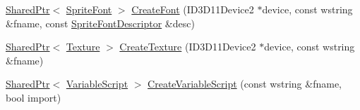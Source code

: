 \begin{DoxyCompactItemize}
\item 
\hyperlink{namespacemage_a1e01ae66713838a7a67d30e44c67703e}{Shared\+Ptr}$<$ \hyperlink{classmage_1_1_sprite_font}{Sprite\+Font} $>$ \hyperlink{classmage_1_1_resource_factory_a4f2e39f6195c13bd885c46b8d130bdfc}{Create\+Font} (I\+D3\+D11\+Device2 $\ast$device, const wstring \&fname, const \hyperlink{structmage_1_1_sprite_font_descriptor}{Sprite\+Font\+Descriptor} \&desc)
\item 
\hyperlink{namespacemage_a1e01ae66713838a7a67d30e44c67703e}{Shared\+Ptr}$<$ \hyperlink{classmage_1_1_texture}{Texture} $>$ \hyperlink{classmage_1_1_resource_factory_ab7f2069f6baf97fb158bf45a76e0a657}{Create\+Texture} (I\+D3\+D11\+Device2 $\ast$device, const wstring \&fname)
\item 
\hyperlink{namespacemage_a1e01ae66713838a7a67d30e44c67703e}{Shared\+Ptr}$<$ \hyperlink{classmage_1_1_variable_script}{Variable\+Script} $>$ \hyperlink{classmage_1_1_resource_factory_a523e3f76a3d8347f6d75a7b87a291b1e}{Create\+Variable\+Script} (const wstring \&fname, bool import)
\end{DoxyCompactItemize}
